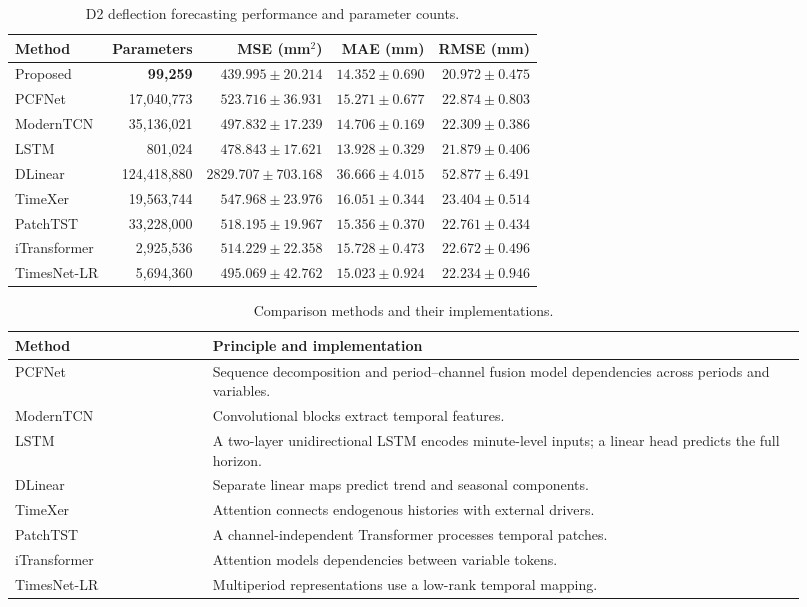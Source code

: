 \begin{table}[H]
\centering
\caption{D2 deflection forecasting performance and parameter counts.}
\label{tab:d2_overall_performance}
\manuscripttablestyle
\setlength{\tabcolsep}{2.65pt}
\begin{tabular*}{\manuscripttablewidth}{@{\extracolsep{\fill}}lrrrr}
\toprule
Method & Parameters & MSE (mm$^2$) & MAE (mm) & RMSE (mm) \\
\midrule
Proposed & \textbf{99,259} & $\mathbf{439.995\pm20.214}$ & $14.352\pm0.690$ & $\mathbf{20.972\pm0.475}$ \\
PCFNet & 17,040,773 & $523.716\pm36.931$ & $15.271\pm0.677$ & $22.874\pm0.803$ \\
ModernTCN & 35,136,021 & $497.832\pm17.239$ & $14.706\pm0.169$ & $22.309\pm0.386$ \\
LSTM & 801,024 & $478.843\pm17.621$ & $\mathbf{13.928\pm0.329}$ & $21.879\pm0.406$ \\
DLinear & 124,418,880 & $2829.707\pm703.168$ & $36.666\pm4.015$ & $52.877\pm6.491$ \\
TimeXer & 19,563,744 & $547.968\pm23.976$ & $16.051\pm0.344$ & $23.404\pm0.514$ \\
PatchTST & 33,228,000 & $518.195\pm19.967$ & $15.356\pm0.370$ & $22.761\pm0.434$ \\
iTransformer & 2,925,536 & $514.229\pm22.358$ & $15.728\pm0.473$ & $22.672\pm0.496$ \\
TimesNet-LR & 5,694,360 & $495.069\pm42.762$ & $15.023\pm0.924$ & $22.234\pm0.946$ \\
\bottomrule
\end{tabular*}
\end{table}

\begin{table}[!htbp]
\centering
\caption{Comparison methods and their implementations.}
\label{tab:baseline_methods}
\small
\renewcommand{\arraystretch}{1.15}
\begin{tabular}{>{\raggedright\arraybackslash}p{0.23\linewidth}>{\raggedright\arraybackslash}p{0.69\linewidth}}
\hline
Method & Principle and implementation \\
\hline
PCFNet & Sequence decomposition and period--channel fusion model dependencies across periods and variables. \\
ModernTCN & Convolutional blocks extract temporal features. \\
LSTM & A two-layer unidirectional LSTM encodes minute-level inputs; a linear head predicts the full horizon. \\
DLinear & Separate linear maps predict trend and seasonal components. \\
TimeXer & Attention connects endogenous histories with external drivers. \\
PatchTST & A channel-independent Transformer processes temporal patches. \\
iTransformer & Attention models dependencies between variable tokens. \\
TimesNet-LR & Multiperiod representations use a low-rank temporal mapping. \\
\hline
\end{tabular}
\end{table}